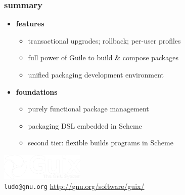 \documentclass{beamer}
\begin{document}
\begin{frame}
  \frametitle{summary}

  \begin{itemize}
  \item \textbf{features}
    \begin{itemize}
    \item transactional upgrades; rollback; per-user profiles
    \item full power of Guile to build \& compose packages
    \item unified packaging development environment
    \end{itemize}
  \item \textbf{foundations}
    \begin{itemize}
    \item purely functional package management
    \item packaging DSL embedded in Scheme
    \item second tier: flexible builds programs in Scheme
    \end{itemize}
  \end{itemize}
\end{frame}

\begin{frame}{}

\vfill{
  \vspace{6.5cm}
  \hfill{\includegraphics[width=0.3\textwidth]{images/guix-logo-white}}\\[0.2cm]
  \texttt{ludo@gnu.org} \hfill{\alert{\url{http://gnu.org/software/guix/}}}
}

\end{frame}
\end{document}
